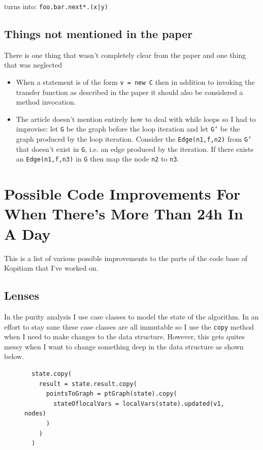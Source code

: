 \documentclass[11pt]{exam}
\begin{document}
turns into: \texttt{foo.bar.next*.(x|y)}

\subsection{Things not mentioned in the paper}

There is one thing that wasn't completely clear from the paper and one
thing that was neglected

\begin{itemize}
  \item When a statement is of the form \texttt{v = new C} then in
        addition to invoking the transfer function as described in
        the paper it should also be considered a method invocation.
  \item The article doesn't mention entirely how to deal with while loops
        so I had to improvise: let \texttt{G} be the graph before the loop
        iteration and let \texttt{G'} be the graph produced by the loop
        iteration. Consider the \texttt{Edge(n1,f,n2)} from \texttt{G'}
        that doesn't exist in \texttt{G}, i.e. an edge produced by the
        iteration. If there exists an \texttt{Edge(n1,f,n3)} in \texttt{G}
        then map the node \texttt{n2} to \texttt{n3}.
\end{itemize}

\newpage

\section{Possible Code Improvements For When There's More Than 24h In A Day}

This is a list of various possible improvements to the parts of the
code base of Kopitiam that I've worked on.

\subsection{Lenses}

In the purity analysis I use case classes to model the state of the
algorithm. In an effort to stay sane these case classes are all
immutable so I use the \texttt{copy} method when I need to make
changes to the data structure. However, this gets quites messy when I
want to change something deep in the data structure as shown below.

\begin{figure}[h!]
  \begin{lstlisting}
  state.copy(
    result = state.result.copy(
      pointsToGraph = ptGraph(state).copy(
        stateOflocalVars = localVars(state).updated(v1, nodes)
      )
    )
  )
  \end{lstlisting}
\end{figure}
\end{document}
